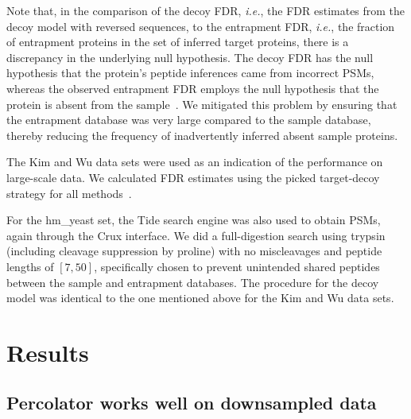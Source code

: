 \documentclass{article}
\begin{document}
Note that, in the comparison of the decoy FDR, {\em i.e.}, the FDR
estimates from the decoy model with reversed sequences, to the
entrapment FDR, {\em i.e.}, the fraction of entrapment proteins in the
set of inferred target proteins, there is a discrepancy in the
underlying null hypothesis. The decoy FDR has the null hypothesis that
the protein's peptide inferences came from incorrect PSMs, whereas the
observed entrapment FDR employs the null hypothesis that the protein
is absent from the sample~\cite{the:how}. We mitigated this problem by
ensuring that the entrapment database was very large compared to the
sample database, thereby reducing the frequency of inadvertently
inferred absent sample proteins.

The Kim and Wu data sets were used as an indication of the performance
on large-scale data. We calculated FDR estimates using the picked
target-decoy strategy for all methods~\cite{savitski2015scalable}.

For the hm\_yeast set, the Tide search engine was also used to obtain
PSMs, again through the Crux interface. We did a full-digestion search
using trypsin (including cleavage suppression by proline) with no
miscleavages and peptide lengths of $[7,50]$, specifically chosen to
prevent unintended shared peptides between the sample and entrapment
databases. The procedure for the decoy model was identical to the one 
mentioned above for the Kim and Wu data sets.

\section*{Results}

\subsection*{Percolator works well on downsampled data}
\end{document}
